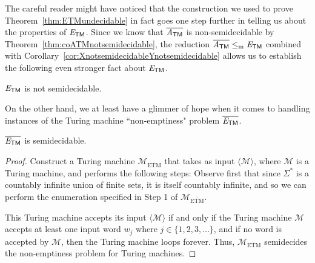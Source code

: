 The careful reader might have noticed that the construction we used to prove Theorem~\ref{thm:ETMundecidable} in fact goes one step further in telling us about the properties of $\mathit{E}_{\textsf{TM}}$. Since we know that $\overline{\mathit{A}_{\textsf{TM}}}$ is non-semidecidable by Theorem~\ref{thm:coATMnotsemidecidable}, the reduction $\overline{\mathit{A}_{\textsf{TM}}} \leq_{\mathrm{m}} \mathit{E}_{\textsf{TM}}$ combined with Corollary~\ref{cor:XnotsemidecidableYnotsemidecidable} allows us to establish the following even stronger fact about $\mathit{E}_{\textsf{TM}}$.

\begin{corollary}\label{cor:ETMnotsemidecidable}
$\mathit{E}_{\textsf{TM}}$ is not semidecidable.
\end{corollary}

On the other hand, we at least have a glimmer of hope when it comes to handling instances of the Turing machine ``non-emptiness" problem $\overline{\mathit{E}_{\textsf{TM}}}$.

\begin{theorem}\label{thm:coETMsemidecidable}
$\overline{\mathit{E}_{\textsf{TM}}}$ is semidecidable.

\begin{proof}
Construct a Turing machine $\mathcal{M}_{\overline{\mathrm{ETM}}}$ that takes as input $\langle \mathcal{M} \rangle$, where $\mathcal{M}$ is a Turing machine, and performs the following steps:
Observe first that since $\Sigma^{*}$ is a countably infinite union of finite sets, it is itself countably infinite, and so we can perform the enumeration specified in Step 1 of $\mathcal{M}_{\overline{\mathrm{ETM}}}$.

This Turing machine accepts its input $\langle \mathcal{M} \rangle$ if and only if the Turing machine $\mathcal{M}$ accepts at least one input word $w_{j}$ where $j \in \{1, 2, 3, \dots\}$, and if no word is accepted by $\mathcal{M}$, then the Turing machine loops forever. Thus, $\mathcal{M}_{\overline{\mathrm{ETM}}}$ semidecides the non-emptiness problem for Turing machines.
\end{proof}
\end{theorem}

